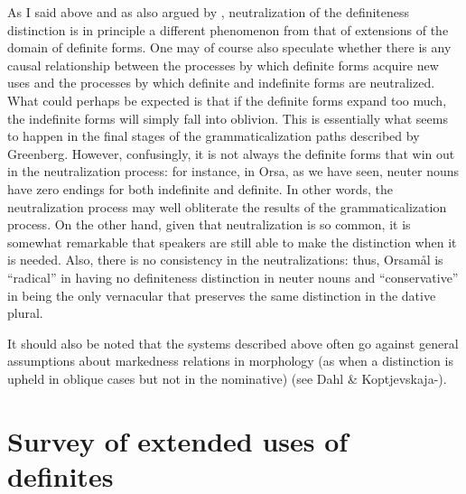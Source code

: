 \begin{styleBodytextC}
As I said above and as also argued by \citet{Hummelstedt1934}, neutralization of the definiteness distinction is in principle a different phenomenon from that of extensions of the domain of definite forms. One may of course also speculate whether there is any causal relationship between the processes by which definite forms acquire new uses and the processes by which definite and indefinite forms are neutralized. What could perhaps be expected is that if the definite forms expand too much, the indefinite forms will simply fall into oblivion. This is essentially what seems to happen in the final stages of the grammaticalization paths described by Greenberg. However, confusingly, it is not always the definite forms that win out in the neutralization process: for instance, in Orsa, as we have seen, neuter nouns have zero endings for both indefinite and definite. In other words, the neutralization process may well obliterate the results of the grammaticalization process. On the other hand, given that neutralization is so common, it is somewhat remarkable that speakers are still able to make the distinction when it is needed. Also, there is no consistency in the neutralizations: thus, Orsamål is “radical” in having no definiteness distinction in neuter nouns and “conservative” in being the only vernacular that preserves the same distinction in the dative plural.

\end{styleBodytextC}

\begin{styleBodytextC}
It should also be noted that the systems described above often go against general assumptions about markedness relations in morphology (as when a distinction is upheld in oblique cases but not in the nominative) (see Dahl \& Koptjevskaja-\citet{Tamm2006}).

\end{styleBodytextC}

\section{\rmfamily\bfseries Survey of extended uses of definites}
